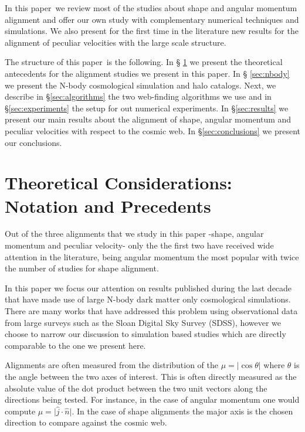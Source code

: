 \documentclass[useAMS,usenatbib]{mn2e}
\newcommand{\documentname}{paper~}
\begin{document}
In this \documentname we review most of the studies about shape and
angular momentum alignment and offer our own study with complementary
numerical techniques and simulations.  We also present for the first
time in the literature new results for the alignment of peculiar
velocities with the large scale structure.

The structure of this \documentname is the following. In \S
\ref{sec:theory} we present the theoretical antecedents for the
alignment studies we present in this paper. In \S
\ref{sec:nbody} we present the N-body
cosmological simulation and halo catalogs.  Next, we describe in
\S\ref{sec:algorithms} the two web-finding algorithms we use and in
\S\ref{sec:experiments} the setup for out numerical experiments. In
\S\ref{sec:results} we present our main results about the alignment
of shape, angular momentum and peculiar velocities with respect to the cosmic
web. In \S\ref{sec:conclusions} we present our conclusions.


\section{Theoretical Considerations: Notation and Precedents}
\label{sec:theory}


Out of the three alignments that we study in this paper -shape,
angular momentum and peculiar velocity- only the the first two have
received wide attention in the literature, being angular momentum the
most popular with twice the number of studies for shape alignment.

In this paper we focus our attention on results published during the last
decade that have made use of large N-body dark matter only
cosmological simulations. There are many works that have addressed
this problem using observational data from large surveys such as the
Sloan Digital Sky Survey (SDSS), however we choose to narrow our
discussion to simulation based studies which are %
directly comparable to the one we present here.

Alignments are often measured from the distribution of the
$\mu=\vert\cos\theta\vert$ where $\theta$ is the angle between the two axes of
interest. This is often directly measured as the absolute value of
the dot product between the two unit vectors along the directions
being tested. For instance, in the case of angular momentum one would compute
$\mu=\vert\hat{j}\cdot\hat{n}\vert$. In the case of shape alignments the major
axis is the chosen direction to compare against the cosmic web.
\end{document}
